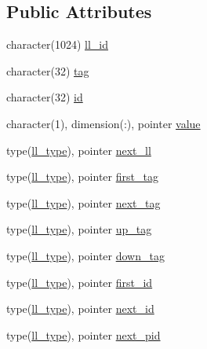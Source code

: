 \subsection*{Public Attributes}
\begin{DoxyCompactItemize}
\item 
character(1024) \hyperlink{structll__module_1_1ll__type_a00a13f2be3d837b02d9d3d077ba8cbe5}{ll\+\_\+id}
\item 
character(32) \hyperlink{structll__module_1_1ll__type_a984131c3c61b8fb97170e5e376c40b09}{tag}
\item 
character(32) \hyperlink{structll__module_1_1ll__type_aba121ee1152cbef3575b7ec86a79f8c0}{id}
\item 
character(1), dimension(\+:), pointer \hyperlink{structll__module_1_1ll__type_aae295ec399655c86ef3a9cd31bf00004}{value}
\item 
type(\hyperlink{structll__module_1_1ll__type}{ll\+\_\+type}), pointer \hyperlink{structll__module_1_1ll__type_a7ca79cd77297558ece770335a23e3118}{next\+\_\+ll}
\item 
type(\hyperlink{structll__module_1_1ll__type}{ll\+\_\+type}), pointer \hyperlink{structll__module_1_1ll__type_ae9e4c15f89cc0b4c9d6cea9acf5fb0c8}{first\+\_\+tag}
\item 
type(\hyperlink{structll__module_1_1ll__type}{ll\+\_\+type}), pointer \hyperlink{structll__module_1_1ll__type_af5be22fa182b45e18c47d040cb88a6c0}{next\+\_\+tag}
\item 
type(\hyperlink{structll__module_1_1ll__type}{ll\+\_\+type}), pointer \hyperlink{structll__module_1_1ll__type_ac65372c106a08fe5f5e7bec2199c513f}{up\+\_\+tag}
\item 
type(\hyperlink{structll__module_1_1ll__type}{ll\+\_\+type}), pointer \hyperlink{structll__module_1_1ll__type_a109f4a1fc222502095c755cce2742a35}{down\+\_\+tag}
\item 
type(\hyperlink{structll__module_1_1ll__type}{ll\+\_\+type}), pointer \hyperlink{structll__module_1_1ll__type_a5f4aff1485cdccd51cacbe1faac6ef21}{first\+\_\+id}
\item 
type(\hyperlink{structll__module_1_1ll__type}{ll\+\_\+type}), pointer \hyperlink{structll__module_1_1ll__type_a25596106993cf8ea5e79035746ed3bc9}{next\+\_\+id}
\item 
type(\hyperlink{structll__module_1_1ll__type}{ll\+\_\+type}), pointer \hyperlink{structll__module_1_1ll__type_a98920eaae52b77e1e855547e2f7e707c}{next\+\_\+pid}
\end{DoxyCompactItemize}


